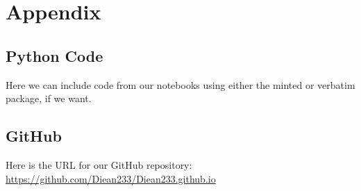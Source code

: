 \documentclass[12pt,a4paper]{article}
\begin{document}
\appendix
\section{Appendix}

\subsection{Python Code}
Here we can include code from our notebooks using either the minted or verbatim package, if we want.



\subsection{GitHub}

Here is the URL for our GitHub repository:\\

\url{https://github.com/Diean233/Diean233.github.io}
\end{document}
